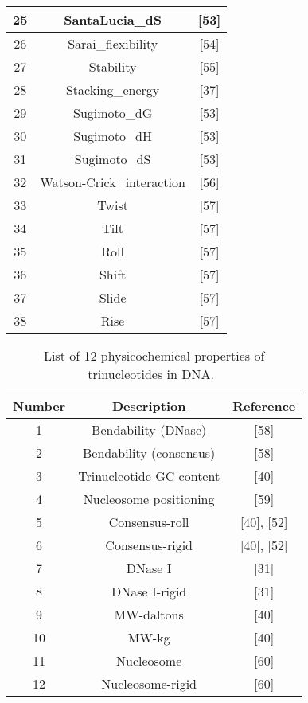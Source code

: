 \begin{footnotesize}
\begin{longtable}{ccc}
        25 & SantaLucia\_dS	& [53] \\\midrule
        26 & Sarai\_flexibility	& [54] \\\midrule
        27 & Stability	& [55] \\\midrule
        28 & Stacking\_energy	& [37] \\\midrule
        29 & Sugimoto\_dG	& [53] \\\midrule
        30 & Sugimoto\_dH	& [53] \\\midrule
        31 & Sugimoto\_dS	& [53] \\\midrule
        32 & Watson-Crick\_interaction	& [56] \\\midrule
        33 & Twist	& [57] \\\midrule
        34 & Tilt	& [57] \\\midrule
        35 & Roll	& [57] \\\midrule
        36 & Shift	& [57] \\\midrule
        37 & Slide	& [57] \\\midrule
        38 & Rise	& [57] \\
        
        \bottomrule
        
    \end{longtable}
\end{footnotesize}
    
\begin{footnotesize}
    \begin{longtable}{ccc}
        \caption{List of 12 physicochemical properties of trinucleotides in DNA.~\cite{Chen2014PseKNC:Composition}}
        \label{tab:12_tri}
        \endfirsthead
        \endhead
        \toprule
        \textbf{Number} & \textbf{Description} & \textbf{Reference}\\\midrule
        
        1	& Bendability (DNase)	& [58]\\\midrule
        2	& Bendability (consensus)	& [58]\\\midrule
        3	& Trinucleotide GC content	& [40]\\\midrule
        4	& Nucleosome positioning	& [59]\\\midrule
        5	& Consensus-roll	& [40], [52]\\\midrule
        6	& Consensus-rigid	& [40], [52]\\\midrule
        7	& DNase I	& [31]\\\midrule
        8	& DNase I-rigid	& [31]\\\midrule
        9	& MW-daltons	& [40]\\\midrule
        10	& MW-kg &	[40]\\\midrule
        11	& Nucleosome	& [60]\\\midrule
        12	& Nucleosome-rigid	& [60]\\
        
        \bottomrule
        
    \end{longtable}
\end{footnotesize}

